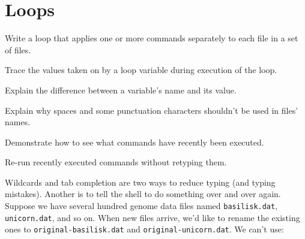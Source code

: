 
\section{Loops}

\begin{objectives}
\begin{swcitemize}
\item
  Write a loop that applies one or more commands separately to each file
  in a set of files.
\item
  Trace the values taken on by a loop variable during execution of the
  loop.
\item
  Explain the difference between a variable's name and its value.
\item
  Explain why spaces and some punctuation characters shouldn't be used
  in files' names.
\item
  Demonstrate how to see what commands have recently been executed.
\item
  Re-run recently executed commands without retyping them.
\end{swcitemize}
\end{objectives}

Wildcards and tab completion are two ways to reduce typing (and typing
mistakes). Another is to tell the shell to do something over and over
again. Suppose we have several hundred genome data files named
\texttt{basilisk.dat}, \texttt{unicorn.dat}, and so on. When new files
arrive, we'd like to rename the existing ones to
\texttt{original-basilisk.dat} and \texttt{original-unicorn.dat}. We
can't use:


